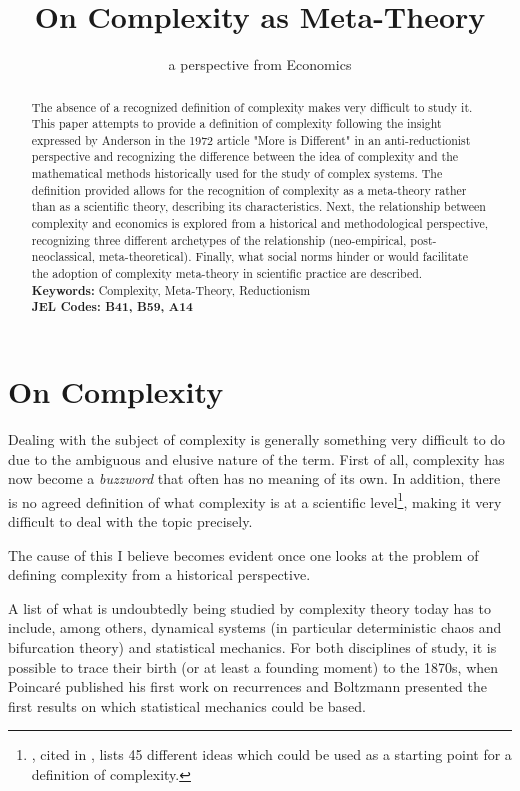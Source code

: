 \documentclass[a4paper, headings=standardclasses]{scrartcl}
\title{On Complexity as Meta-Theory}
\subtitle{a perspective from Economics}
\author{}
\date{}
\begin{document}
\maketitle

\begin{abstract}
	The absence of a recognized definition of complexity makes very difficult to study it.
	This paper attempts to provide a definition of complexity following the insight expressed by Anderson in the 1972 article "More is Different" in an anti-reductionist perspective and recognizing the difference between the idea of complexity and the mathematical methods historically used for the study of complex systems.
	The definition provided allows for the recognition of complexity as a meta-theory rather than as a scientific theory, describing its characteristics.
	Next, the relationship between complexity and economics is explored from a historical and methodological perspective, recognizing three different archetypes of the relationship (neo-empirical, post-neoclassical, meta-theoretical).
	Finally, what social norms hinder or would facilitate the adoption of complexity meta-theory in scientific practice are described. \\
	\textbf{Keywords:} Complexity, Meta-Theory, Reductionism\\
	\textbf{JEL Codes: B41, B59, A14}
\end{abstract}

\section{On Complexity}
Dealing with the subject of complexity is generally something very difficult to do due to the ambiguous and elusive nature of the term.
First of all, complexity has now become a \textit{buzzword} that often has no meaning of its own.
In addition, there is no agreed definition of what complexity is at a scientific level\footnote{\textcite{horgan2015}, cited in \textcite{holt2011}, lists 45 different ideas which could be used as a starting point for a definition of complexity.}, making it very difficult to deal with the topic precisely.

The cause of this I believe becomes evident once one looks at the problem of defining complexity from a historical perspective.

A list of what is undoubtedly being studied by complexity theory today has to include, among others, dynamical systems (in particular deterministic chaos and bifurcation theory) and statistical mechanics. For both disciplines of study, it is possible to trace their birth (or at least a founding moment) to the 1870s, when Poincaré published his first work on recurrences and Boltzmann presented the first results on which statistical mechanics could be based.
\end{document}
